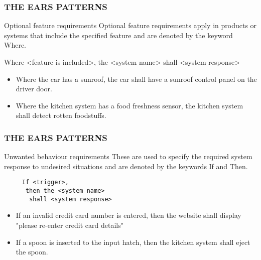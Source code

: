 \documentclass[aspectratio=169]{beamer}
\begin{document}
\begin{frame}[fragile]
  \frametitle{THE EARS PATTERNS}
  \begin{block}{Optional feature requirements}
  Optional feature requirements apply in products or systems that include the specified feature and are denoted by the keyword Where.
    \begin{center}
      Where <feature is included>, 
       the <system name> 
        shall <system response>
    \end{center}
  \end{block}
  
  \begin{example}
  \begin{itemize}
    \item Where the car has a sunroof, the car shall have a sunroof control panel on the driver door.
    \item Where the kitchen system has a food freshness sensor, the kitchen system shall detect rotten foodstuffs. 
  \end{itemize}
  \end{example}
\end{frame}



\begin{frame}[fragile]
  \frametitle{THE EARS PATTERNS}
  \begin{block}{Unwanted behaviour requirements}
    These are used to specify the required system response to undesired situations and are denoted by the keywords If and Then.
    \begin{verbatim}
     If <trigger>, 
      then the <system name> 
       shall <system response> 
    \end{verbatim}
      \end{block}
  
  \begin{example}
  \begin{itemize}
    \item If an invalid credit card number is entered, then the website shall display "please re-enter credit card details"
    \item  If a spoon is inserted to the input hatch, then the kitchen system shall eject the spoon.
  \end{itemize}
  \end{example}
\end{frame}
\end{document}
